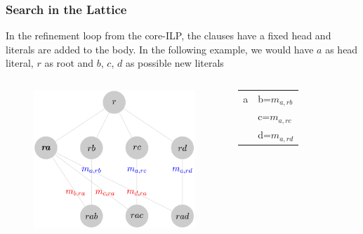\documentclass{beamer}
\begin{document}
\begin{frame}
\frametitle{Search in the Lattice}
  In the refinement loop from the core-ILP, the clauses have a fixed head and literals are added to the body.
  In the following example, we would have $a$ as head literal, $r$ as root and $b$, $c$, $d$ as possible new
literals
 \begin{columns}[c]
    \begin{figure}
    \includegraphics[height=0.5\textheight]{./Figures/headmap}
    \end{figure}
      \begin{tabular}{r | l}
	a & b=$m_{a,rb}$ \\
	  & c=$m_{a,rc}$ \\
	  & d=$m_{a,rd}$
      \end{tabular}
 \end{columns} 
\end{frame}
\end{document}
